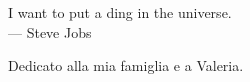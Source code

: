 \cleardoublepage
{}
\thispagestyle{empty}

\vspace*{3cm}

\begin{center}
    I want to put a ding in the universe. \\ \medskip
    --- Steve Jobs
\end{center}

\medskip

\begin{center}
    Dedicato alla mia famiglia e a Valeria.
\end{center}
